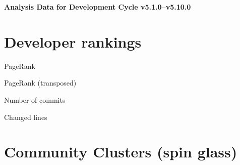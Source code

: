 \documentclass{article}
\begin{document}
\setlength{\parindent}{0pt}
\begin{center}
\begin{Large}
\textbf{Analysis Data for Development Cycle v5.1.0--v5.10.0}
\end{Large}
\end{center}
\section{Developer rankings}
\begin{small}\renewcommand{\tabcolsep}{1pt}
\begin{minipage}{0.5\linewidth}
PageRank\\

\end{minipage}%
\begin{minipage}{0.5\linewidth}
PageRank (transposed)\\

\end{minipage}

\renewcommand{\tabcolsep}{5pt}
\begin{minipage}{0.5\linewidth}
Number of commits\\

\end{minipage}%
\begin{minipage}{0.5\linewidth}
Changed lines\\

\end{minipage}
\end{small}
\newpage\section{Community Clusters (spin glass)}
\end{document}
